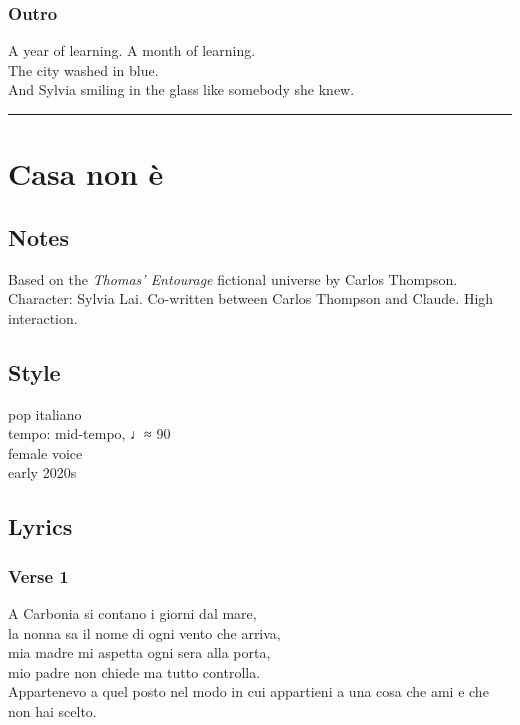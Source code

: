 \subsubsection{Outro}\label{outro-4}

A year of learning. A month of learning.\\
The city washed in blue.\\
And Sylvia smiling in the glass like somebody she knew.

\begin{center}\rule{0.5\linewidth}{0.5pt}\end{center}

\section{Casa non è}\label{casa-non-uxe8}

\subsection{Notes}\label{notes-15}

Based on the \emph{Thomas' Entourage} fictional universe by Carlos
Thompson. Character: Sylvia Lai. Co-written between Carlos Thompson and
Claude. High interaction.

\subsection{Style}\label{style-14}

pop italiano\\
tempo: mid-tempo, ♩≈ 90\\
female voice\\
early 2020s

\subsection{Lyrics}\label{lyrics-14}

\subsubsection{Verse 1}\label{verse-1-10}

A Carbonia si contano i giorni dal mare,\\
la nonna sa il nome di ogni vento che arriva,\\
mia madre mi aspetta ogni sera alla porta,\\
mio padre non chiede ma tutto controlla.\\
Appartenevo a quel posto nel modo in cui appartieni a una cosa che ami e
che non hai scelto.

